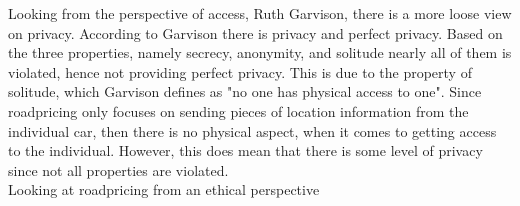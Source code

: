 Looking from the perspective of access, Ruth Garvison, there is a more loose view on privacy. According to Garvison there is privacy and perfect privacy. Based on the three properties, namely secrecy, anonymity, and solitude nearly all of them is violated, hence not providing perfect privacy. This is due to the property of solitude, which Garvison defines as "no one has physical access to one". Since roadpricing only focuses on sending pieces of location information from the individual car, then there is no physical aspect, when it comes to getting access to the individual. However, this does mean that there is some level of privacy since not all properties are violated. \\


\noindent Looking at roadpricing from an ethical perspective